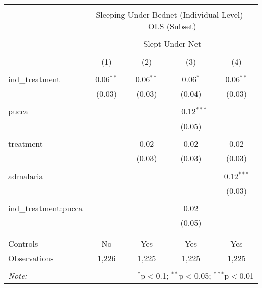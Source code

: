 
\begin{table}[!htbp] \centering 
  \caption{} 
  \label{tbl:Sleeping Under Bednet (Individual Level) - OLS (Subset)} 
\begin{tabular}{@{\extracolsep{5pt}}lcccc} 
\\[-1.8ex]\hline 
\hline \\[-1.8ex] 
 & \multicolumn{4}{c}{Sleeping Under Bednet (Individual Level) - OLS (Subset)} \\ 
\cline{2-5} 
\\[-1.8ex] & \multicolumn{4}{c}{Slept Under Net} \\ 
\\[-1.8ex] & (1) & (2) & (3) & (4)\\ 
\hline \\[-1.8ex] 
 ind\_treatment & 0.06$^{**}$ & 0.06$^{**}$ & 0.06$^{*}$ & 0.06$^{**}$ \\ 
  & (0.03) & (0.03) & (0.04) & (0.03) \\ 
  & & & & \\ 
 pucca &  &  & $-$0.12$^{***}$ &  \\ 
  &  &  & (0.05) &  \\ 
  & & & & \\ 
 treatment &  & 0.02 & 0.02 & 0.02 \\ 
  &  & (0.03) & (0.03) & (0.03) \\ 
  & & & & \\ 
 admalaria &  &  &  & 0.12$^{***}$ \\ 
  &  &  &  & (0.03) \\ 
  & & & & \\ 
 ind\_treatment:pucca &  &  & 0.02 &  \\ 
  &  &  & (0.05) &  \\ 
  & & & & \\ 
\hline \\[-1.8ex] 
Controls & No & Yes & Yes & Yes \\ 
Observations & 1,226 & 1,225 & 1,225 & 1,225 \\ 
\hline 
\hline \\[-1.8ex] 
\textit{Note:}  & \multicolumn{4}{r}{$^{*}$p$<$0.1; $^{**}$p$<$0.05; $^{***}$p$<$0.01} \\ 
\end{tabular} 
\end{table} 
